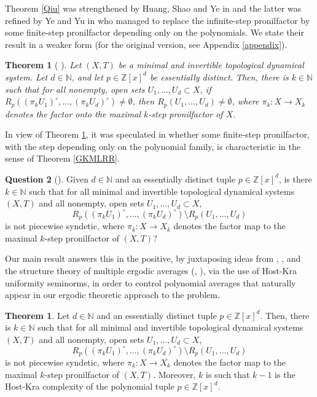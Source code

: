 \documentclass[reqno]{amsart}
\def\Z{{\mathbb Z}}
\def\N{{\mathbb N}}
\newtheorem{theorem}{Theorem}[section]
\theoremstyle{definition}
\newtheorem{question}[theorem]{Question}
\newtheorem{thmx}{Theorem}
\theoremstyle{remark}
\def\N{{\mathbb N}}
\begin{document}
Theorem \ref{Qiu} was strengthened by Huang, Shao and Ye in 
\cite{Huang_Shao_Ye} and the latter was refined by Ye and Yu in \cite{Ye_Yu} who managed to 
replace the infinite-step pronilfactor by some finite-step 
pronilfactor depending only on the polynomials. We state their 
result in a weaker form (for the original version, see Appendix \ref{appendix}). 

\begin{theorem}[{{ \cite[Theorem A]{Ye_Yu}}}]\label{Ye Yu}
Let $(X,T)$ be a minimal and invertible
topological dynamical system. Let $d\in \N$, and let $p\in \Z[x]^d$ be essentially distinct. Then, there is $k\in \N$ such that for all nonempty, open sets $U_1,\ldots,U_d\subset X$, if $R_p((\pi_k U_1)^{\circ},\ldots,(\pi_k U_d)^{\circ}) \neq \emptyset$, then $R_p(U_1,\ldots,U_d) \neq \emptyset$,
where $\pi_k: X\to X_k$ denotes the factor onto the maximal $k$-step pronilfactor of $X$. 
\end{theorem}

In view of Theorem \ref{Ye Yu}, it was speculated in 
\cite{GKLMRR} 
whether some finite-step pronilfactor, with the step 
depending 
only on the polynomial family, is characteristic in the sense 
of Theorem \ref{GKMLRR}. 

\begin{question}[{{\cite[Question 5.1]{GKLMRR}}}]\label{finite step nilfactor in GKLMRR}
Given $d\in \N$ and an essentially distinct tuple $p\in \Z[x]^d$, is there $k\in \N$ such that for all minimal and invertible
topological dynamical systems $(X,T)$ and all nonempty, open sets $U_1,\ldots,U_d \subset X$, 
\begin{equation}\label{finite set nilfactor eq}
R_p((\pi_k U_1)^{\circ},\ldots,(\pi_k U_d)^{\circ}) \setminus R_p(U_1,\ldots,U_d)   
\end{equation}
is not piecewise syndetic, where $\pi_k:X\to X_k$ denotes the factor map to the maximal $k$-step pronilfactor of $(X,T)$?   
\end{question}

Our main result answers this in the positive, by juxtaposing 
ideas from \cite{GKLMRR}, \cite{Ye_Yu}, and the structure 
theory of multiple ergodic averages (\cite{Host_Kra_nonconventional_averages_nilmanifolds:2005}, \cite{Ziegler07}), via the use of 
Host-Kra uniformity seminorms, in order to control polynomial 
averages that naturally 
appear in our ergodic theoretic approach to the problem.

\begin{thmx}\label{Main theorem}
Let $d\in \N$ and an essentially distinct tuple $p\in \Z[x]^d$. 
Then, there is $k\in \N$ such that for all minimal and invertible
topological dynamical systems $(X,T)$ and all nonempty, open 
sets $U_1,\ldots,U_d \subset X$,
\begin{equation}\label{finite set nilfactor eq}
R_p((\pi_k U_1)^{\circ},\ldots,(\pi_k U_d)^{\circ}) \setminus R_p(U_1,\ldots,U_d)   
\end{equation}
is not piecewise syndetic, where $\pi_k:X\to X_k$ denotes the 
factor map to the maximal $k$-step pronilfactor of $(X,T)$. 
Moreover, $k$ is such that $k-1$ is the Host-Kra 
complexity of the polynomial tuple $p\in \Z[x]^d$.  
\end{thmx}
\end{document}
